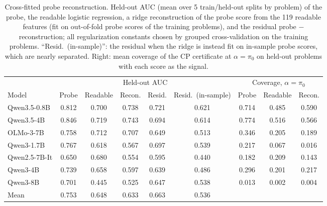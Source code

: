\begin{table}[H]
\centering\small
\caption{Cross-fitted probe reconstruction. Held-out AUC (mean over 5 train/held-out splits by problem) of the probe, the readable logistic regression, a ridge reconstruction of the probe score from the 119 readable features (fit on out-of-fold probe scores of the training problems), and the residual probe $-$ reconstruction; all regularization constants chosen by grouped cross-validation on the training problems. ``Resid.\ (in-sample)'': the residual when the ridge is instead fit on in-sample probe scores, which are nearly separated. Right: mean coverage of the CP certificate at $\alpha=\pi_0$ on held-out problems with each score as the signal.}
\label{tab:recon}
\setlength{\tabcolsep}{4pt}
\begin{tabular}{l ccccc ccc}
\toprule
 & \multicolumn{5}{c}{Held-out AUC} & \multicolumn{3}{c}{Coverage, $\alpha=\pi_0$} \\
\cmidrule(lr){2-6}\cmidrule(lr){7-9}
Model & Probe & Readable & Recon. & Resid. & Resid.\ (in-sample) & Probe & Readable & Recon. \\
\midrule
Qwen3.5-0.8B & 0.812 & 0.700 & 0.738 & 0.721 & 0.621 & 0.714 & 0.485 & 0.590 \\
Qwen3.5-4B & 0.846 & 0.719 & 0.743 & 0.694 & 0.614 & 0.774 & 0.516 & 0.566 \\
OLMo-3-7B & 0.758 & 0.712 & 0.707 & 0.649 & 0.513 & 0.346 & 0.205 & 0.189 \\
Qwen3-1.7B & 0.767 & 0.618 & 0.567 & 0.697 & 0.539 & 0.217 & 0.067 & 0.016 \\
Qwen2.5-7B-It & 0.650 & 0.680 & 0.554 & 0.595 & 0.440 & 0.182 & 0.209 & 0.143 \\
Qwen3-4B & 0.739 & 0.658 & 0.597 & 0.639 & 0.486 & 0.296 & 0.201 & 0.217 \\
Qwen3-8B & 0.701 & 0.445 & 0.525 & 0.647 & 0.538 & 0.013 & 0.002 & 0.004 \\
\midrule
Mean & 0.753 & 0.648 & 0.633 & 0.663 & 0.536 &  &  &  \\
\bottomrule
\end{tabular}
\end{table}
